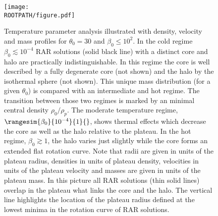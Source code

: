 \begin{figure}%
	\centering%
	\texttt{[image: \\ROOTPATH/figure.pdf]}
	\caption{Temperature parameter analysis illustrated with density, velocity and mass profiles for $\theta_0 = 30$ and $\beta_0 \leq 10^2$. In the cold regime $\beta_0\lesssim 10^{-4}$ RAR solutions (solid black line) with a distinct core and halo are practically indistinguishable. In this regime the core is well described by a fully degenerate core (not shown) and the halo by the isothermal sphere (not shown). This unique mass distribution (for a given $\theta_0$) is compared with an intermediate and hot regime. The transition between those two regimes is marked by an minimal central density $\rho_0/\rho_p$. The moderate temperature regime, $\rangesim{\beta_0}{10^{-4}}{1}{}$, shows thermal effects which decrease the core as well as the halo relative to the plateau. In the hot regime, $\beta_0 \gtrsim 1$, the halo varies just slightly while the core forms an extended flat rotation curve. Note that radii are given in units of the plateau radius, densities in units of plateau density, velocities in units of the plateau velocity and masses are given in units of the plateau mass. In this picture all RAR solutions (thin solid lines) overlap in the plateau what links the core and the halo. The vertical line highlights the location of the plateau radius defined at the lowest minima in the rotation curve of RAR solutions.}%
	\label{fig:profiles:without-cutoff:central-temperature:plateau}%
\end{figure}